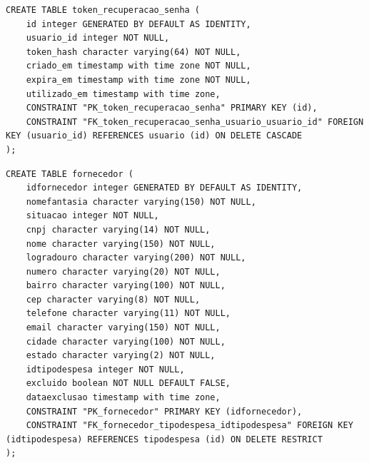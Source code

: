 \begin{quadro}[H]
\caption{Script SQL — Tabela \texttt{token\_recuperacao\_senha}}
\label{qua:script-token_recuperacao_senha}
\begin{minipage}{0.96\textwidth}
\begin{lstlisting}[style=academic-sql]
CREATE TABLE token_recuperacao_senha (
    id integer GENERATED BY DEFAULT AS IDENTITY,
    usuario_id integer NOT NULL,
    token_hash character varying(64) NOT NULL,
    criado_em timestamp with time zone NOT NULL,
    expira_em timestamp with time zone NOT NULL,
    utilizado_em timestamp with time zone,
    CONSTRAINT "PK_token_recuperacao_senha" PRIMARY KEY (id),
    CONSTRAINT "FK_token_recuperacao_senha_usuario_usuario_id" FOREIGN KEY (usuario_id) REFERENCES usuario (id) ON DELETE CASCADE
);
\end{lstlisting}
\end{minipage}
\end{quadro}

\begin{quadro}[H]
\caption{Script SQL — Tabela fornecedor}
\label{qua:script-fornecedor}
\begin{minipage}{0.96\textwidth}
\begin{lstlisting}[style=academic-sql]
CREATE TABLE fornecedor (
    idfornecedor integer GENERATED BY DEFAULT AS IDENTITY,
    nomefantasia character varying(150) NOT NULL,
    situacao integer NOT NULL,
    cnpj character varying(14) NOT NULL,
    nome character varying(150) NOT NULL,
    logradouro character varying(200) NOT NULL,
    numero character varying(20) NOT NULL,
    bairro character varying(100) NOT NULL,
    cep character varying(8) NOT NULL,
    telefone character varying(11) NOT NULL,
    email character varying(150) NOT NULL,
    cidade character varying(100) NOT NULL,
    estado character varying(2) NOT NULL,
    idtipodespesa integer NOT NULL,
    excluido boolean NOT NULL DEFAULT FALSE,
    dataexclusao timestamp with time zone,
    CONSTRAINT "PK_fornecedor" PRIMARY KEY (idfornecedor),
    CONSTRAINT "FK_fornecedor_tipodespesa_idtipodespesa" FOREIGN KEY (idtipodespesa) REFERENCES tipodespesa (id) ON DELETE RESTRICT
);
\end{lstlisting}
\end{minipage}
\end{quadro}

